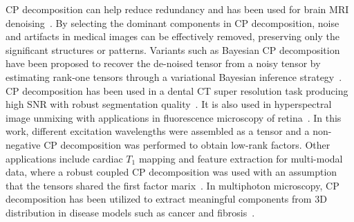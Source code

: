 CP decomposition can help reduce redundancy and has been used for brain MRI denoising~\cite{cao2016tensor, cui2020multidimensional}. By selecting the dominant components in CP decomposition, noise and artifacts in medical images can be effectively removed, preserving only the significant structures or patterns. Variants such as Bayesian CP decomposition have been proposed to recover the de-noised tensor from a noisy tensor by estimating rank-one tensors through a variational Bayesian inference strategy~\cite{cao2016tensor}. CP decomposition has been used in a dental CT super resolution task producing high SNR with robust segmentation quality~\cite{hatvani2018tensor}. It is also used in hyperspectral image unmixing with applications in fluorescence microscopy of retina~\cite{dey2019tensor}. In this work, different excitation wavelengths were assembled as a tensor and a non-negative CP decomposition was performed to obtain low-rank factors. Other applications include cardiac $T_1$ mapping \cite{yaman2019low} and feature extraction for multi-modal data, where a robust coupled CP decomposition was used with an assumption that the tensors shared the first factor marix~\cite{zhao2023robust}. In multiphoton microscopy, CP decomposition has been utilized to extract meaningful components from 3D distribution in disease models such as cancer and fibrosis~\cite{uckermann2020label}.



